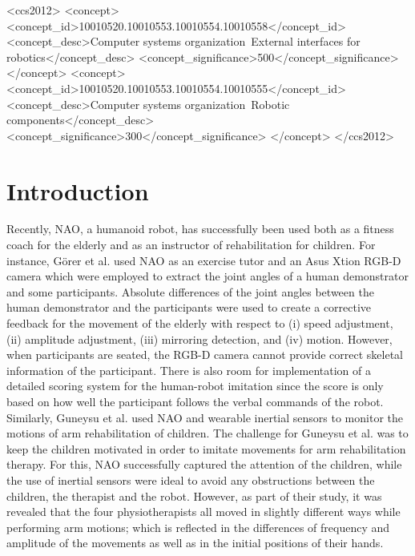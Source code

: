 \documentclass{sig-alternate-05-2015}
\begin{document}
\begin{CCSXML}
<ccs2012>
<concept>
<concept_id>10010520.10010553.10010554.10010558</concept_id>
<concept_desc>Computer systems organization~External interfaces for robotics</concept_desc>
<concept_significance>500</concept_significance>
</concept>
<concept>
<concept_id>10010520.10010553.10010554.10010555</concept_id>
<concept_desc>Computer systems organization~Robotic components</concept_desc>
<concept_significance>300</concept_significance>
</concept>
</ccs2012>
\end{CCSXML}




\printccsdesc


\section{Introduction}
Recently, NAO, a humanoid robot, has successfully been used both as a fitness coach for the elderly
and as an instructor of rehabilitation for children.
For instance, G{\"{o}}rer et al. \cite{Gorer2016} used NAO as an exercise tutor and an Asus Xtion RGB-D camera
which were employed to extract the joint angles of a human demonstrator and some participants.
Absolute differences of the joint angles between the human demonstrator and the participants
were used to create a corrective feedback for the movement of the elderly
with respect to (i) speed adjustment, (ii) amplitude adjustment, (iii) mirroring detection, and (iv) motion.
However, when participants are seated, the RGB-D camera cannot provide
correct skeletal information of the participant.
There is also room for implementation of a detailed scoring system for the human-robot imitation
since the score is only based on how well the participant follows the verbal commands of the robot.
Similarly, Guneysu et al. \cite{Guneysu2015} used NAO and wearable inertial sensors
to monitor the motions of arm rehabilitation of children.
The challenge for Guneysu et al. was to keep the children motivated in order to imitate
movements for arm rehabilitation therapy.
For this, NAO successfully captured the attention of the children,
while the use of inertial sensors were ideal to avoid any
obstructions between the children, the therapist and the robot.
However, as part of their study,
it was revealed that the four physiotherapists all moved in slightly different ways
while performing arm motions;
which is reflected in the differences of frequency and amplitude of the movements
as well as in the initial positions of their hands.
\end{document}
